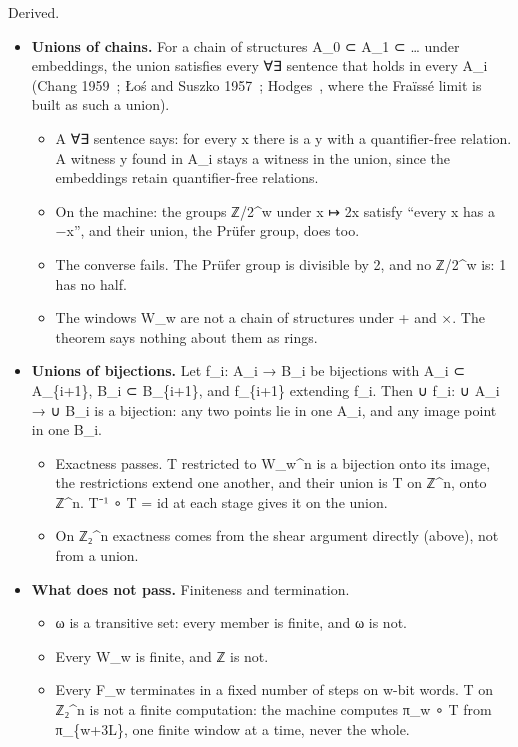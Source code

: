 Derived.

\begin{itemize}
\item \textbf{Unions of chains.} For a chain of structures A\_\allowbreak{}0 ⊂ A\_\allowbreak{}1 ⊂ … under embeddings, the union satisfies every ∀∃ sentence that holds in every A\_\allowbreak{}i (Chang 1959~\cite{src:Chang-1959}; Łoś and Suszko 1957~\cite{src:o-and-Suszko-1957}; Hodges~\cite{src:Hodges-1993}, where the Fraïssé limit is built as such a union).

\begin{itemize}
\item A ∀∃ sentence says: for every x there is a y with a quantifier-free relation. A witness y found in A\_\allowbreak{}i stays a witness in the union, since the embeddings retain quantifier-free relations.
\item On the machine: the groups ℤ/2\textasciicircum{}w under x ↦ 2x satisfy “every x has a −x”, and their union, the Prüfer group, does too.
\item The converse fails. The Prüfer group is divisible by 2, and no ℤ/2\textasciicircum{}w is: 1 has no half.
\item The windows W\_\allowbreak{}w are not a chain of structures under + and ×. The theorem says nothing about them as rings.
\end{itemize}
\item \textbf{Unions of bijections.} Let f\_\allowbreak{}i: A\_\allowbreak{}i → B\_\allowbreak{}i be bijections with A\_\allowbreak{}i ⊂ A\_\allowbreak{}\{i+1\}, B\_\allowbreak{}i ⊂ B\_\allowbreak{}\{i+1\}, and f\_\allowbreak{}\{i+1\} extending f\_\allowbreak{}i. Then ∪ f\_\allowbreak{}i: ∪ A\_\allowbreak{}i → ∪ B\_\allowbreak{}i is a bijection: any two points lie in one A\_\allowbreak{}i, and any image point in one B\_\allowbreak{}i.

\begin{itemize}
\item Exactness passes. T restricted to W\_\allowbreak{}w\textasciicircum{}n is a bijection onto its image, the restrictions extend one another, and their union is T on ℤ\textasciicircum{}n, onto ℤ\textasciicircum{}n. T⁻¹ ∘ T = id at each stage gives it on the union.
\item On ℤ₂\textasciicircum{}n exactness comes from the shear argument directly (above), not from a union.
\end{itemize}
\item \textbf{What does not pass.} Finiteness and termination.

\begin{itemize}
\item ω is a transitive set: every member is finite, and ω is not.
\item Every W\_\allowbreak{}w is finite, and ℤ is not.
\item Every F\_\allowbreak{}w terminates in a fixed number of steps on w-bit words. T on ℤ₂\textasciicircum{}n is not a finite computation: the machine computes π\_\allowbreak{}w ∘ T from π\_\allowbreak{}\{w+3L\}, one finite window at a time, never the whole.
\end{itemize}
\end{itemize}

